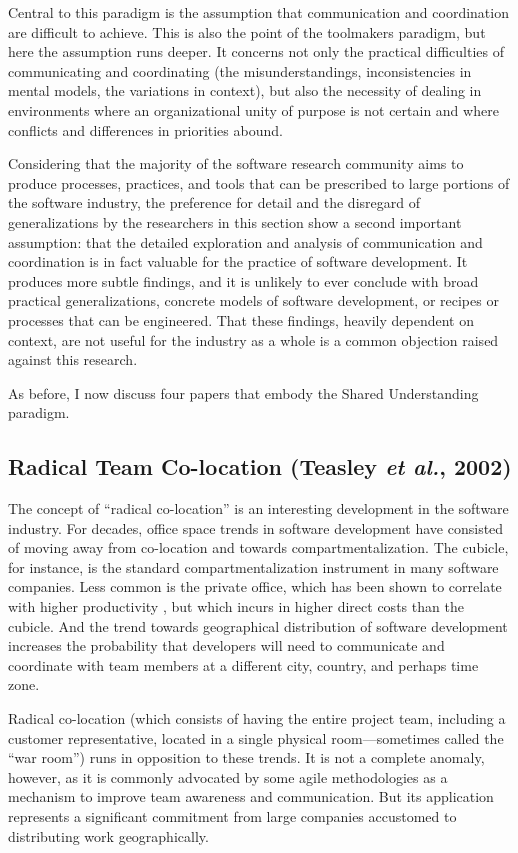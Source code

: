 Central to this paradigm is the assumption that communication and coordination are difficult to achieve. This is also the point of the toolmakers paradigm, but here the assumption runs deeper. It concerns not only the practical difficulties of communicating and coordinating (the misunderstandings, inconsistencies in mental models, the variations in context), but also the necessity of dealing in environments where an organizational unity of purpose is not certain and where conflicts and differences in priorities abound.

Considering that the majority of the software research community aims to produce processes, practices, and tools that can be prescribed to large portions of the software industry, the preference for detail and the disregard of generalizations by the researchers in this section show a second important assumption: that the detailed exploration and analysis of communication and coordination is in fact valuable for the practice of software development. It produces more subtle findings, and it is unlikely to ever conclude with broad practical generalizations, concrete models of software development, or recipes or processes that can be engineered. That these findings, heavily dependent on context, are not useful for the industry as a whole is a common objection raised against this research.

As before, I now discuss four papers that embody the Shared Understanding paradigm.


\subsection{Radical Team Co-location (Teasley \emph{et al.}, 2002)}
\label{sec:Teasley}

The concept of ``radical co-location'' is an interesting development in the software industry. For decades, office space trends in software development have consisted of moving away from co-location and towards compartmentalization. The cubicle, for instance, is the standard compartmentalization instrument in many software companies. Less common is the private office, which has been shown to correlate with higher productivity \cite{DeMarco1987}, but which incurs in higher direct costs than the cubicle. And the trend towards geographical distribution of software development increases the probability that developers will need to communicate and coordinate with team members at a different city, country, and perhaps time zone.

Radical co-location (which consists of having the entire project team, including a customer representative, located in a single physical room---sometimes called the ``war room'') runs in opposition to these trends. It is not a complete anomaly, however, as it is commonly advocated by some agile methodologies as a mechanism to improve team awareness and communication. But its application represents a significant commitment from large companies accustomed to distributing work geographically.

